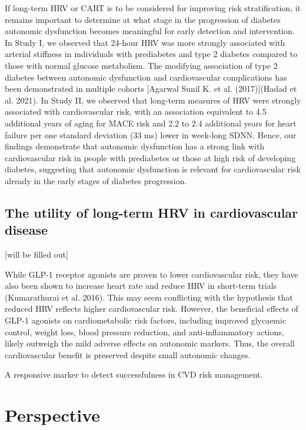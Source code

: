 \documentclass[
  a4paper,
  headsepline=true,
  open=any]{scrbook}
\begin{document}
If long-term HRV or CART is to be considered for improving risk
stratification, it remains important to determine at what stage in the
progression of diabetes autonomic dysfunction becomes meaningful for
early detection and intervention. In Study I, we observed that 24-hour
HRV was more strongly associated with arterial stiffness in individuals
with prediabetes and type 2 diabetes compared to those with normal
glucose metabolism. The modifying association of type 2 diabetes between
autonomic dysfunction and cardiovascular complications has been
demonstrated in multiple cohorts {[}Agarwal Sunil K. et al.
(2017){]}(Hadad et al. 2021). In Study II, we observed that long-term
measures of HRV were strongly associated with cardiovascular risk, with
an association equivalent to 4.5 additional years of aging for MACE risk
and 2.2 to 2.4 additional years for heart failure per one standard
deviation (33 ms) lower in week-long SDNN. Hence, our findings
demonstrate that autonomic dysfunction has a strong link with
cardiovascular risk in people with prediabetes or those at high risk of
developing diabetes, suggesting that autonomic dysfunction is relevant
for cardiovascular risk already in the early stages of diabetes
progression.

\hypertarget{the-utility-of-long-term-hrv-in-cardiovascular-disease}{%
\section{The utility of long-term HRV in cardiovascular
disease}\label{the-utility-of-long-term-hrv-in-cardiovascular-disease}}

{[}will be filled out{]}

While GLP-1 receptor agonists are proven to lower cardiovascular risk,
they have also been shown to increase heart rate and reduce HRV in
short-term trials (Kumarathurai et al. 2016). This may seem conflicting
with the hypothesis that reduced HRV reflects higher cardiovascular
risk. However, the beneficial effects of GLP-1 agonists on
cardiometabolic risk factors, including improved glycaemic control,
weight loss, blood pressure reduction, and anti-inflammatory actions,
likely outweigh the mild adverse effects on autonomic markers. Thus, the
overall cardiovascular benefit is preserved despite small autonomic
changes.

A responsive marker to detect successfulness in CVD risk management.


\hypertarget{perspective}{%
\chapter{Perspective}\label{perspective}}
\end{document}
